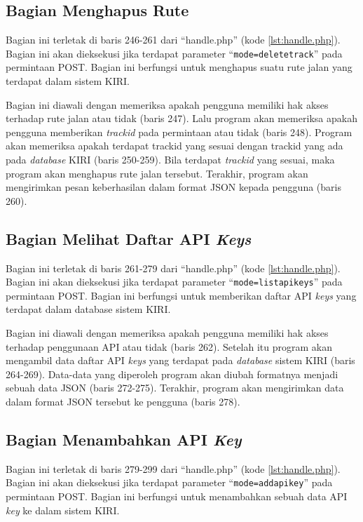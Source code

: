 \subsection{Bagian Menghapus Rute}
\label{sec:hapusrute}
Bagian ini terletak di baris 246-261 dari ``handle.php'' (kode \ref{lst:handle.php}). Bagian ini akan dieksekusi jika terdapat parameter ``\texttt{mode=deletetrack}'' pada permintaan POST. Bagian ini berfungsi untuk menghapus suatu rute jalan yang terdapat dalam sistem KIRI.

Bagian ini diawali dengan memeriksa apakah pengguna memiliki hak akses terhadap rute jalan atau tidak (baris 247). Lalu program akan memeriksa apakah pengguna memberikan \textit{trackid} pada permintaan atau tidak (baris 248). Program akan memeriksa apakah terdapat {trackid} yang sesuai dengan {trackid} yang ada pada \textit{database} KIRI (baris 250-259). Bila terdapat \textit{trackid} yang sesuai, maka program akan menghapus rute jalan tersebut. Terakhir, program akan mengirimkan pesan keberhasilan dalam format JSON kepada pengguna (baris 260).

\subsection{Bagian Melihat Daftar API \textit{Keys}}
\label{sec:lihatapikeys}
Bagian ini terletak di baris 261-279 dari ``handle.php'' (kode \ref{lst:handle.php}). Bagian ini akan dieksekusi jika terdapat parameter ``\texttt{mode=listapikeys}'' pada permintaan POST. Bagian ini berfungsi untuk memberikan daftar API \textit{keys} yang terdapat dalam database sistem KIRI.

Bagian ini diawali dengan memeriksa apakah pengguna memiliki hak akses terhadap penggunaan API atau tidak (baris 262). Setelah itu program akan mengambil data daftar API \textit{keys} yang terdapat pada \textit{database} sistem KIRI (baris 264-269). Data-data yang diperoleh program akan diubah formatnya menjadi sebuah data JSON (baris 272-275). Terakhir, program akan mengirimkan data dalam format JSON tersebut ke pengguna (baris 278).

\subsection{Bagian Menambahkan API \textit{Key}}
\label{sec:tambahapikey}
Bagian ini terletak di baris 279-299 dari ``handle.php'' (kode \ref{lst:handle.php}). Bagian ini akan dieksekusi jika terdapat parameter ``\texttt{mode=addapikey}'' pada permintaan POST. Bagian ini berfungsi untuk menambahkan sebuah data API \textit{key} ke dalam sistem KIRI.

